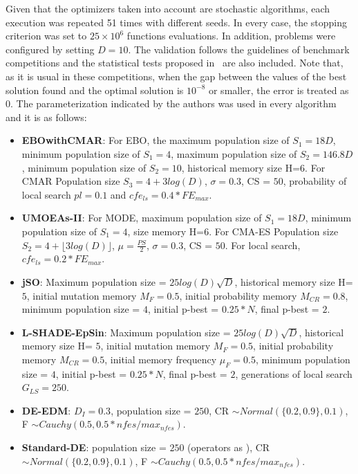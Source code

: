 Given that the optimizers taken into account are stochastic algorithms, each execution was repeated 51 times with different seeds.
%
In every case, the stopping criterion was set to $25 \times 10^6$ functions evaluations.
%
In addition, problems were configured by setting $D = 10$. 
%
The validation follows the guidelines of \CEC{} benchmark competitions and the statistical tests proposed in~\cite{Joel:StatisticalTest} are also included.
%
%
%
Note that, as it is usual in these competitions, when the gap between the values of the best solution found and the optimal solution is $10^{-8}$ or smaller, 
the error is treated as $0$.
%
%
The parameterization indicated by the authors was used in every algorithm and it is as follows:
\begin{itemize}
\item \textbf{EBOwithCMAR}: For EBO, the maximum population size of $S_1 = 18D$, minimum population size of $S_1 = 4$, maximum population size of $S_2 = 146.8D$, minimum population size of $S_2 = 10$, historical memory size H=$6$. For CMAR Population size $S_3 = 4 + 3log(D)$, $\sigma=0.3$, CS = $50$, probability of local search $pl = 0.1$ and $cfe_{ls} = 0.4* FE_{max}$.
\item \textbf{UMOEAs-II}: For MODE, maximum population size of $S_1 = 18D$, minimum population size of $S_1 = 4$, size memory H=$6$. For CMA-ES Population size $S_2 = 4 + \lfloor 3log(D) \rfloor$, $\mu=\frac{PS}{2}$, $\sigma=0.3$, CS = $50$. For local search, $cfe_{ls} = 0.2 * FE_{max}$.
\item \textbf{jSO}: Maximum population size = $25log(D)\sqrt{D}$, historical memory size H= $5$, initial mutation memory $M_F = 0.5$, initial probability memory $M_{CR} = 0.8$, minimum population size = $4$, initial p-best = $0.25*N$, final p-best = $2$.
\item \textbf{L-SHADE-EpSin}: Maximum population size = $25log(D)\sqrt{D}$, historical memory size H= $5$, initial mutation memory $M_F = 0.5$, initial probability memory $M_{CR} = 0.5$, initial memory frequency $\mu_F = 0.5$, minimum population size = $4$, initial p-best = $0.25*N$, final p-best = $2$, generations of local search $G_{LS}=250$.
\item \textbf{ DE-EDM}: $D_I = 0.3$, population size = $250$, CR $\sim Normal( \{0.2, 0.9\}, 0.1)$, F $\sim Cauchy(0.5, 0.5*nfes/max_{nfes})$.
\item \textbf{ Standard-DE}: population size = $250$ (operators as \DEEDM{}), CR $\sim Normal( \{0.2, 0.9\}, 0.1)$, F $\sim Cauchy(0.5, 0.5*nfes/max_{nfes})$.
\end{itemize}
%

